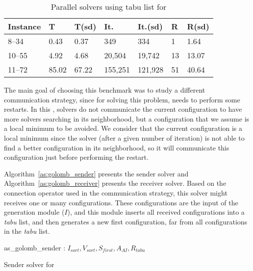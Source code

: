 \begin{table}[h]
\centering 
\renewcommand{\arraystretch}{1}
\begin{tabular}{p{2cm}|R{1.2cm}R{1.2cm}|R{1.5cm}R{1.5cm}|R{0.8cm}R{1.2cm}}
	\hline 	
	{\bf Instance} & T & T(sd) & It. & It.(sd) & R & R(sd)\\
	\hline
	8--34 & 0.43 & 0.37 & 349 & 334 & 1 & 1.64\\
	10--55 & 4.92 & 4.68 & 20,504 & 19,742 & 13 & 13.07\\
	11--72 & 85.02 & 67.22 & 155,251 & 121,928 & 51 & 40.64\\
	\hline
\end{tabular}
\caption{Parallel solvers using tabu list for \GRP}
\label{tab:golomb_par_tabu}
\end{table}

\separation

The main goal of choosing this benchmark was to study a different communication strategy, since for solving this problem, \posl{} needs to perform some restarts. In this \commstr, solvers do not communicate the current configuration to have more solvers searching in its neighborhood, but a configuration that we assume is a local minimum to be avoided. We consider that the current configuration is a local minimum since the solver (after a given number of iteration) is not able to find a better configuration in its neighborhood, so it will communicate this configuration just before performing the restart. 

Algorithm~\ref{as:golomb_sender} presents the sender solver and Algorithm~\ref{as:golomb_receiver} presents the receiver solver. Based on the connection operator used in the communication strategy, this solver might receives one or many configurations. These configurations are the input of the generation module ($I$), and this module inserts all received configurations into a {\it tabu} list, and then generates a new first configuration, far from all configurations in the {\it tabu} list.

\begin{algorithm}
\dontprintsemicolon
\SetNoline
{}
   as\_golomb\_sender\;
\algoindent {} : $I_{sort}, V_{sort}, S_{first}, A_{AI}, R_{tabu}$ \;
\caption{Sender solver for \GRP}\label{as:golomb_sender}
\end{algorithm}


